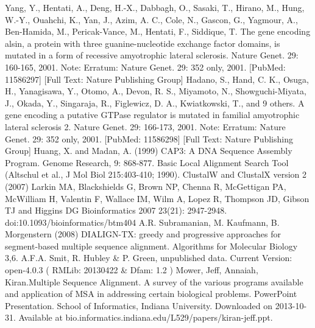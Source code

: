 \documentclass[10.8pt]{article} %
\begin{document}
\begin{thebibliography}{99}
{  Yang, Y., Hentati, A., Deng, H.-X., Dabbagh, O., Sasaki, T., Hirano, M., Hung, W.-Y., Ouahchi, K., Yan, J., Azim, A. C., Cole, N.,
  Gascon, G., Yagmour, A., Ben-Hamida, M., Pericak-Vance, M., Hentati, F., Siddique, T. The gene encoding alsin, a protein with three
  guanine-nucleotide exchange factor domains, is mutated in a form of recessive amyotrophic lateral sclerosis. Nature Genet. 29: 160-165,
  2001. Note: Erratum: Nature Genet. 29: 352 only, 2001. [PubMed: 11586297] [Full Text: Nature Publishing Group]
  Hadano, S., Hand, C. K., Osuga, H., Yanagisawa, Y., Otomo, A., Devon, R. S., Miyamoto, N., Showguchi-Miyata, J., Okada, Y., Singaraja,
  R., Figlewicz, D. A., Kwiatkowski, T., and 9 others. A gene encoding a putative GTPase regulator is mutated in familial amyotrophic
  lateral sclerosis 2. Nature Genet. 29: 166-173, 2001. Note: Erratum: Nature Genet. 29: 352 only, 2001. [PubMed: 11586298] [Full Text:
  Nature Publishing Group]
  Huang, X. and Madan, A. (1999) CAP3: A DNA Sequence Assembly Program. Genome Research, 9: 868-877.
  Basic Local Alignment Search Tool (Altschul et al., J Mol Biol 215:403-410; 1990).
  ClustalW and ClustalX version 2 (2007) Larkin MA, Blackshields G, Brown NP, Chenna R, McGettigan PA, McWilliam H, Valentin F, 
  Wallace IM, Wilm A, Lopez R, Thompson JD, Gibson TJ and Higgins DG Bioinformatics 2007 23(21): 2947-2948.
  doi:10.1093/bioinformatics/btm404 
  A.R. Subramanian, M. Kaufmann, B. Morgenstern (2008)
  DIALIGN-TX: greedy and progressive approaches for segment-based multiple sequence alignment.
  Algorithms for Molecular Biology 3,6.
 A.F.A. Smit, R. Hubley \& P. Green, unpublished data. Current Version: open-4.0.3 ( RMLib: 20130422 \& Dfam: 1.2 )
  Mower, Jeff, Annaiah, Kiran.Multiple Sequence Alignment. A survey of the various programs available and application of MSA in
  addressing certain biological problems. PowerPoint Presentation. School of Informatics, Indiana University. Downloaded on
  2013-10-31. Available at bio.informatics.indiana.edu/L529/papers/kiran-jeff.ppt.
}
\end{thebibliography}
\end{document}
